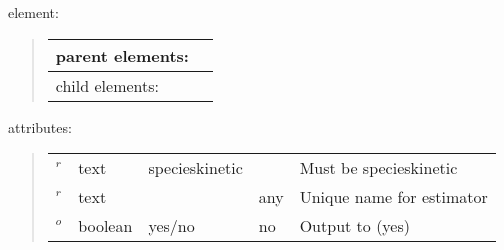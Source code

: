 \documentclass[letterpaper,10pt,english]{sphinxmanual}
\begin{document}
 element:
\begin{quote}


\begin{savenotes}\sphinxattablestart
\centering
\begin{tabulary}{\linewidth}[t]{|T|T|}
\hline

parent elements:
&
\\
\hline
child elements:
&
\\
\hline
\end{tabulary}
\par
\sphinxattableend\end{savenotes}
\end{quote}

attributes:
\begin{quote}


\begin{savenotes}\sphinxattablestart
\centering
\begin{tabulary}{\linewidth}[t]{|T|T|T|T|T|}
\hline
\sphinxstyletheadfamily 
{}
&\sphinxstyletheadfamily 
{}
&\sphinxstyletheadfamily 
{}
&\sphinxstyletheadfamily 
{}
&\sphinxstyletheadfamily 
{}
\\
\hline
{}\(^r\)
&
text
&
specieskinetic
&&
Must be specieskinetic
\\
\hline
{}\(^r\)
&
text
&
&
any
&
Unique name for estimator
\\
\hline
{}\(^o\)
&
boolean
&
yes/no
&
no
&
Output to  (yes)
\\
\hline
\end{tabulary}
\par
\sphinxattableend\end{savenotes}
\end{quote}
\def\sphinxLiteralBlockLabel{\label{\detokenize{hamiltonianobservable:listing-31}}}
\begin{sphinxVerbatim}[commandchars=\\\{\}]
     
\end{sphinxVerbatim}
\end{document}
